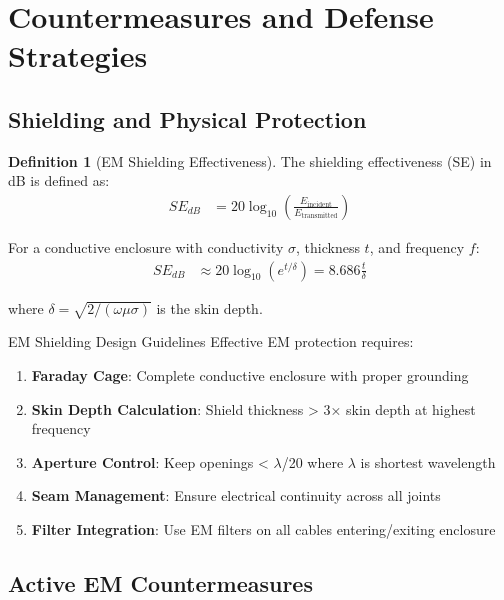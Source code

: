 \documentclass[11pt,a4paper]{article}
\theoremstyle{definition}
\newtheorem{definition}{Definition}[section]
\begin{document}
\section{Countermeasures and Defense Strategies}

\subsection{Shielding and Physical Protection}

\begin{definition}[EM Shielding Effectiveness]
The shielding effectiveness (SE) in dB is defined as:
\begin{align}
SE_{dB} &= 20\log_{10}\left(\frac{E_{\text{incident}}}{E_{\text{transmitted}}}\right)
\end{align}

For a conductive enclosure with conductivity $\sigma$, thickness $t$, and frequency $f$:
\begin{align}
SE_{dB} &\approx 20\log_{10}(e^{t/\delta}) = 8.686 \frac{t}{\delta}
\end{align}

where $\delta = \sqrt{2/(\omega\mu\sigma)}$ is the skin depth.
\end{definition}

\begin{securitybox}{EM Shielding Design Guidelines}
Effective EM protection requires:

\begin{enumerate}
    \item \textbf{Faraday Cage}: Complete conductive enclosure with proper grounding
    \item \textbf{Skin Depth Calculation}: Shield thickness > 3× skin depth at highest frequency
    \item \textbf{Aperture Control}: Keep openings < $\lambda$/20 where $\lambda$ is shortest wavelength
    \item \textbf{Seam Management}: Ensure electrical continuity across all joints
    \item \textbf{Filter Integration}: Use EM filters on all cables entering/exiting enclosure
\end{enumerate}
\end{securitybox}

\subsection{Active EM Countermeasures}
\end{document}
